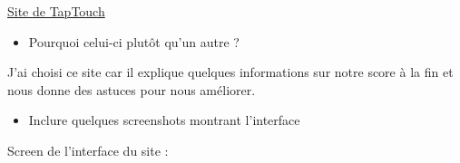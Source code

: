 \documentclass[12pt]{article}
\begin{document}
\href{https://www.taptouche.com/fr/test-de-vitesse}{Site de TapTouch}

\vspace{0.3cm}

\begin{itemize}
  \item Pourquoi celui-ci plutôt qu'un autre ?
\end{itemize}

\vspace{0.3cm}

J'ai choisi ce site car il explique quelques informations sur notre score à la fin et nous donne des astuces pour nous améliorer.

\vspace{0.3cm}

\begin{itemize}
  \item Inclure quelques screenshots montrant l'interface
\end{itemize}

\vspace{0.3cm}

Screen de l'interface du site :

\vspace{0.3cm}
\end{document}
